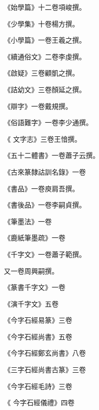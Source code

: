\begin{pinyinscope}
 《始學篇》十二卷項峻撰。



 《少學集》十卷楊方撰。



 《小學篇》一卷王羲之撰。



 《續通俗文》二卷李虔撰。



 《啟疑》三卷顧凱之撰。



 《詰幼文》三卷顏延之撰。



 《辯字》一卷戴規撰。



 《俗語難字》一卷李少通撰。



 《
 文字志》三卷王愔撰。



 《五十二體書》一卷蕭子云撰。



 《古來篆隸詁訓名錄》一卷



 《書品》一卷庾肩吾撰。



 《書後品》一卷李嗣貞撰。



 《筆墨法》一卷



 《鹿紙筆墨疏》一卷



 《千字文》一卷蕭子範撰。



 又一卷周興嗣撰。



 《篆書千字文》一卷



 《演千字文》五卷



 《今字石經易篆》三卷



 《今字石經尚書》五卷



 《今字石經鄭玄尚書》八卷



 《三字石經尚書古篆》三卷



 《今字石經毛詩》三卷



 《
 今字石經儀禮》四卷




\end{pinyinscope}
